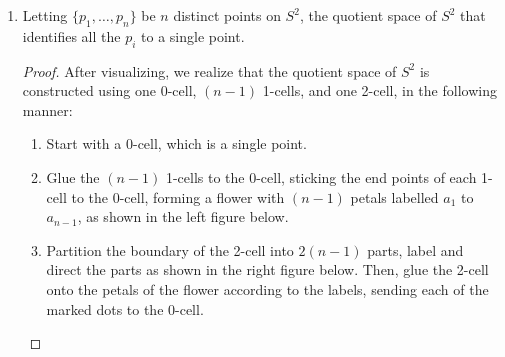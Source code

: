 \documentclass{article}
\begin{document}
\begin{enumerate}
\begin{enumerate}
\begin{proof}
          From construction, we summarize that an $n$-torus is built from
          $\binom{n}{i}$ $i$-cells, for $0\leq i\leq n$. \\
        \end{proof}

      \item Letting $\{p_1,\ldots,p_n\}$ be $n$ distinct points on $S^2$,
        the quotient space of $S^2$ that identifies all the $p_i$ to a
        single point.

        \begin{proof}
          After visualizing, we realize that the quotient space of
          $S^2$ is constructed using one 0-cell, $(n-1)$ 1-cells, and one
          2-cell, in the following manner:
          \begin{enumerate}
            \item Start with a 0-cell, which is a single point.
            \item Glue the $(n-1)$ 1-cells to the 0-cell, sticking the end
              points of each 1-cell to the 0-cell, forming a flower with
              $(n-1)$ petals labelled $a_1$ to $a_{n-1}$, as shown in the
              left figure below.
            \item Partition the boundary of the 2-cell into $2(n-1)$ parts,
              label and direct the parts as shown in the right figure
              below. Then, glue the 2-cell onto the petals of the flower
              according to the labels, sending each of the marked dots to
              the 0-cell.
          \end{enumerate}

          \begin{center}
\end{center}
\end{proof}
\end{enumerate}
\end{enumerate}
\end{document}
